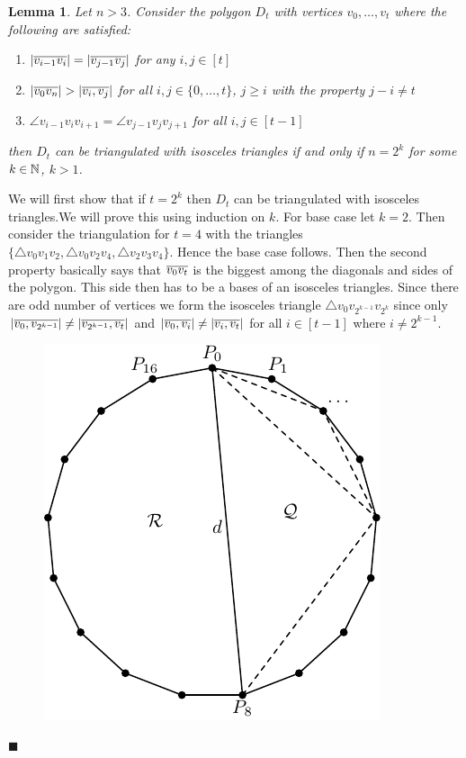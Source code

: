 \documentclass[a4paper, 11pt]{article}
\newtheorem{lemma}{Lemma}
\renewenvironment{proof}{\noindent{\it \textbf{Proof:}}\hspace*{1em}}{\hfill $\blacksquare$\bigskip\\}
\begin{document}
{\begin{itemize}[label=$\bullet$]
\begin{itemize}
	\begin{lemma}\label{p5lm1}
		Let $n>3$. Consider the  polygon $D_t$ with vertices $v_0,\dots, v_t$ where the following are satisfied:\begin{enumerate}
			\item $|\overline{v_{i-1}v_i}|=|\overline{v_{j-1}v_j}|$ for any $i,j\in [t]$ 
			\item $|\ov{v_0v_n}|>|\ov{v_i,v_j}|$ for all $i,j\in\{0,\dots, t\}$, $j\geq i$ with the property $j-i\neq t$ 
			\item  $\angle v_{i-1}v_iv_{i+1}=\angle v_{j-1}v_jv_{j+1}$ for all $i,j\in[t-1]$
		\end{enumerate} then $D_t$ can be triangulated with isosceles triangles if and only if $n=2^k$ for some $k\in\mathbb{N}$, $k>1$.
	\end{lemma}
\begin{proof}
	We will first show that if $t=2^k$ then $D_t$ can be triangulated with isosceles triangles.We will prove this using induction on $k$. For base case let $k=2$. Then  consider the triangulation for $t=4$ with the triangles $\{\triangle v_0v_1v_2, \triangle v_0v_2v_4, \triangle v_2v_3v_4\}$. Hence the base case follows. Then the  second property basically says that $\overline{v_0v_t}$ is the biggest among the diagonals and sides of the polygon. This side then has to be a bases of an isosceles triangles. Since there are odd number of vertices we form the isosceles triangle $\triangle v_0v_{2^{k-1}}v_{2^k} $ since only $|\overline{v_0,v_{2^{k-1}}}|\neq |\overline{v_{2^{k-1}},v_t}|$ and $|\overline{v_0,v_i}|\neq |\overline{v_i,v_t}|$ for all $i\in[t-1]$ where $i\neq 2^{k-1}$. 
	
	\begin{figure}[h]
		\centering
		\includegraphics{workspace.pdf}
	\end{figure}


\end{proof}
\end{itemize}
\end{itemize}}
\end{document}
